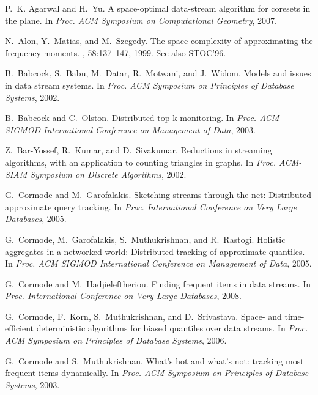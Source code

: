 \documentclass[10pt]{article}
\begin{document}

\begin{thebibliography}{10}

P.~K. Agarwal and H.~Yu.
\newblock A space-optimal data-stream algorithm for coresets in the plane.
\newblock In {\em Proc. ACM Symposium on Computational Geometry}, 2007.

N.~Alon, Y.~Matias, and M.~Szegedy.
\newblock The space complexity of approximating the frequency moments.
, 58:137--147, 1999.
\newblock See also STOC'96.

B.~Babcock, S.~Babu, M.~Datar, R.~Motwani, and J.~Widom.
\newblock Models and issues in data stream systems.
\newblock In {\em Proc. ACM Symposium on Principles of Database Systems}, 2002.

B.~Babcock and C.~Olston.
\newblock Distributed top-k monitoring.
\newblock In {\em Proc. ACM SIGMOD International Conference on Management of
  Data}, 2003.

Z.~Bar-Yossef, R.~Kumar, and D.~Sivakumar.
\newblock Reductions in streaming algorithms, with an application to counting
  triangles in graphs.
\newblock In {\em Proc. ACM-SIAM Symposium on Discrete Algorithms}, 2002.

G.~Cormode and M.~Garofalakis.
\newblock Sketching streams through the net: {D}istributed approximate query
  tracking.
\newblock In {\em Proc. International Conference on Very Large Databases},
  2005.

G.~Cormode, M.~Garofalakis, S.~Muthukrishnan, and R.~Rastogi.
\newblock Holistic aggregates in a networked world: Distributed tracking of
  approximate quantiles.
\newblock In {\em Proc. ACM SIGMOD International Conference on Management of
  Data}, 2005.

G.~Cormode and M.~Hadjieleftheriou.
\newblock Finding frequent items in data streams.
\newblock In {\em Proc. International Conference on Very Large Databases},
  2008.

G.~Cormode, F.~Korn, S.~Muthukrishnan, and D.~Srivastava.
\newblock Space- and time-efficient deterministic algorithms for biased
  quantiles over data streams.
\newblock In {\em Proc. ACM Symposium on Principles of Database Systems}, 2006.

G.~Cormode and S.~Muthukrishnan.
\newblock What's hot and what's not: tracking most frequent items dynamically.
\newblock In {\em Proc. ACM Symposium on Principles of Database Systems}, 2003.


\end{thebibliography}
\end{document}
